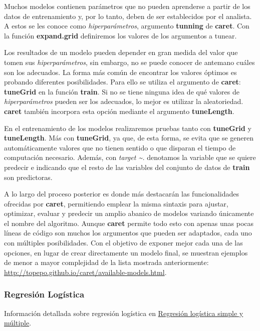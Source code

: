 \documentclass[]{article}
\begin{document}
Muchos modelos contienen parámetros que no pueden aprenderse a partir de
los datos de entrenamiento y, por lo tanto, deben de ser establecidos
por el analista. A estos se les conoce como \emph{hiperparámetros},
argumento \textbf{tunning} de \textbf{caret}. Con la función
\textbf{expand.grid} definiremos los valores de los argumentos a tunear.

Los resultados de un modelo pueden depender en gran medida del valor que
tomen sus \emph{hiperparámetros}, sin embargo, no se puede conocer de
antemano cuáles son los adecuados. La forma más común de encontrar los
valores óptimos es probando diferentes posibilidades. Para ello se
utiliza el argumento de \textbf{caret}: \textbf{tuneGrid} en la función
\textbf{train}. Si no se tiene ninguna idea de qué valores de
\emph{hiperparámetros} pueden ser los adecuados, lo mejor es utilizar la
aleatoriedad. \textbf{caret} también incorpora esta opción mediante el
argumento \textbf{tuneLength}.

En el entrenamiento de los modelos realizaremos pruebas tanto con
\textbf{tuneGrid} y \textbf{tuneLength}. Más con \textbf{tuneGrid}, ya
que, de esta forma, se evita que se generen automáticamente valores que
no tienen sentido o que disparan el tiempo de computación necesario.
Además, con \emph{target \textasciitilde{}.} denotamos la variable que
se quiere predecir e indicando que el resto de las variables del
conjunto de datos de \textbf{train} son predictoras.

A lo largo del proceso posterior es donde más destacarán las
funcionalidades ofrecidas por \textbf{caret}, permitiendo emplear la
misma sintaxis para ajustar, optimizar, evaluar y predecir un amplio
abanico de modelos variando únicamente el nombre del algoritmo. Aunque
\textbf{caret} permite todo esto con apenas unas pocas líneas de código
son muchos los argumentos que pueden ser adaptados, cada uno con
múltiples posibilidades. Con el objetivo de exponer mejor cada una de
las opciones, en lugar de crear directamente un modelo final, se
muestran ejemplos de menor a mayor complejidad de la lista mostrada
anteriormente:
\url{http://topepo.github.io/caret/available-models.html}.

\hypertarget{regresiuxf3n-loguxedstica}{%
\subsubsection{Regresión Logística}\label{regresiuxf3n-loguxedstica}}

Información detallada sobre regresión logística en
\href{https://www.cienciadedatos.net/documentos/27_regresion_logistica_simple_y_multiple}{Regresión
logística simple y múltiple}.
\end{document}
